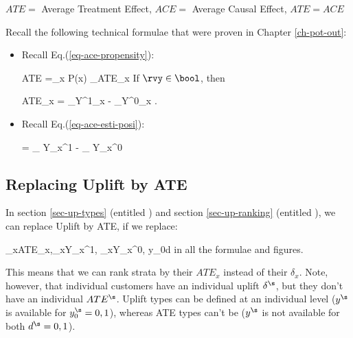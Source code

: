 $ATE=$ Average Treatment Effect, $ACE =$ Average Causal Effect, $ATE=ACE$

Recall
the following technical formulae
that were proven in 
Chapter \ref{ch-pot-out}:



\begin{itemize}

\item
Recall Eq.(\ref{eq-ace-propensity}):

\beq
ATE =\sum_x P(x)
_{ATE_x}
\eeq
If $\rvy\in \bool$, then

\beq
ATE_x
=
_{\displaystyle Y^1_x}
-
_{\displaystyle Y^0_x}
\;.
\eeq

\item
Recall 
Eq.(\ref{eq-ace-esti-posi}):

\beq
{}
=
_
{\displaystyle Y_x^1}
-
_
{\displaystyle Y_x^0}
\label{eq-est-ace-uplift}
\eeq

\end{itemize}

\subsection{Replacing Uplift by ATE}
In section \ref{sec-up-types} (entitled )
and section \ref{sec-up-ranking} (entitled 
),
we can replace Uplift by ATE, if we replace:

\beq
\delta_x\rarrow ATE_x,\quad \av{\rvy}_x\rarrow Y_x^1,\quad
{}_x\rarrow Y_x^0, \quad y_0\rarrow d
\eeq
in all the formulae and figures.

This means that we can rank strata by their $ATE_x$ instead of
their $\delta_x$. Note, however, that individual customers
have an individual uplift $\delta^\s$, but they don't have an
individual $ATE^\s$.
Uplift types
can be defined at an individual level
($y^\s$ is available for
$y^\s_0=0, 1$), whereas ATE types can't be
($y^\s$ is not available for both $d^\s=0,1$).


